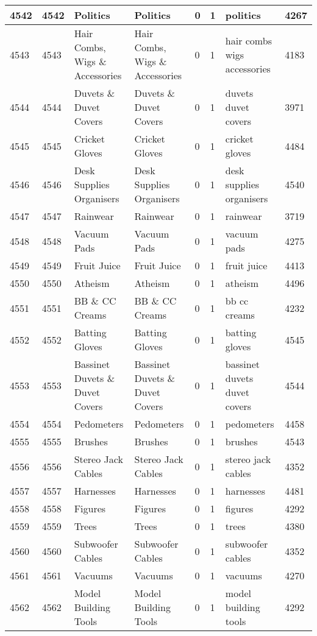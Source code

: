 \begin{longtable}{|l|l|l|l|l|l|l|l|}
4542 & 4542 & Politics & Politics & 0 & 1 & politics & 4267 \\ \hline 
4543 & 4543 & Hair Combs, Wigs \& Accessories & Hair Combs, Wigs \& Accessories & 0 & 1 & hair combs wigs accessories & 4183 \\ \hline 
4544 & 4544 & Duvets \& Duvet Covers & Duvets \& Duvet Covers & 0 & 1 & duvets duvet covers & 3971 \\ \hline 
4545 & 4545 & Cricket Gloves & Cricket Gloves & 0 & 1 & cricket gloves & 4484 \\ \hline 
4546 & 4546 & Desk Supplies Organisers & Desk Supplies Organisers & 0 & 1 & desk supplies organisers & 4540 \\ \hline 
4547 & 4547 & Rainwear & Rainwear & 0 & 1 & rainwear & 3719 \\ \hline 
4548 & 4548 & Vacuum Pads & Vacuum Pads & 0 & 1 & vacuum pads & 4275 \\ \hline 
4549 & 4549 & Fruit Juice & Fruit Juice & 0 & 1 & fruit juice & 4413 \\ \hline 
4550 & 4550 & Atheism & Atheism & 0 & 1 & atheism & 4496 \\ \hline 
4551 & 4551 & BB \& CC Creams & BB \& CC Creams & 0 & 1 & bb cc creams & 4232 \\ \hline 
4552 & 4552 & Batting Gloves & Batting Gloves & 0 & 1 & batting gloves & 4545 \\ \hline 
4553 & 4553 & Bassinet Duvets \& Duvet Covers & Bassinet Duvets \& Duvet Covers & 0 & 1 & bassinet duvets duvet covers & 4544 \\ \hline 
4554 & 4554 & Pedometers & Pedometers & 0 & 1 & pedometers & 4458 \\ \hline 
4555 & 4555 & Brushes & Brushes & 0 & 1 & brushes & 4543 \\ \hline 
4556 & 4556 & Stereo Jack Cables & Stereo Jack Cables & 0 & 1 & stereo jack cables & 4352 \\ \hline 
4557 & 4557 & Harnesses & Harnesses & 0 & 1 & harnesses & 4481 \\ \hline 
4558 & 4558 & Figures & Figures & 0 & 1 & figures & 4292 \\ \hline 
4559 & 4559 & Trees & Trees & 0 & 1 & trees & 4380 \\ \hline 
4560 & 4560 & Subwoofer Cables & Subwoofer Cables & 0 & 1 & subwoofer cables & 4352 \\ \hline 
4561 & 4561 & Vacuums & Vacuums & 0 & 1 & vacuums & 4270 \\ \hline 
4562 & 4562 & Model Building Tools & Model Building Tools & 0 & 1 & model building tools & 4292 \\ \hline 

\end{longtable}
